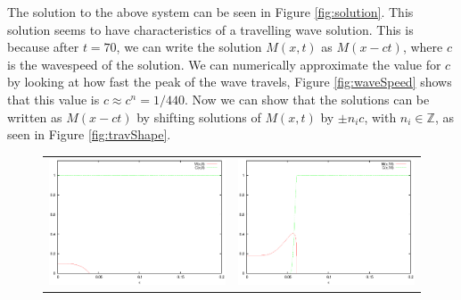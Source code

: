 \documentclass{report}
\begin{document}
The solution to the above system can be seen in Figure \ref{fig:solution}. This solution seems to have characteristics of a travelling wave solution. This is because after $t=70$, we can write the solution $M(x,t)$ as $M(x-ct)$, where $c$ is the wavespeed of the solution. We can numerically approximate the value for $c$ by looking at how fast the peak of the wave travels, Figure \ref{fig:waveSpeed} shows that this value is $c \approx c^n = 1/440$. Now we can show that the solutions can be written as $M(x-ct)$ by shifting solutions of $M(x,t)$ by $\pm n_i c$, with $n_i \in \mathbb{Z}$, as seen in Figure \ref{fig:travShape}.


\begin{figure}[h!tb]
\begin{center}
  \begin{tabular}{c c}
      \includegraphics[scale=0.55]{solution_t0.eps} &
      \includegraphics[scale=0.55]{solution_t10.eps} \\

\end{tabular}
\end{center}
\end{figure}
\end{document}
